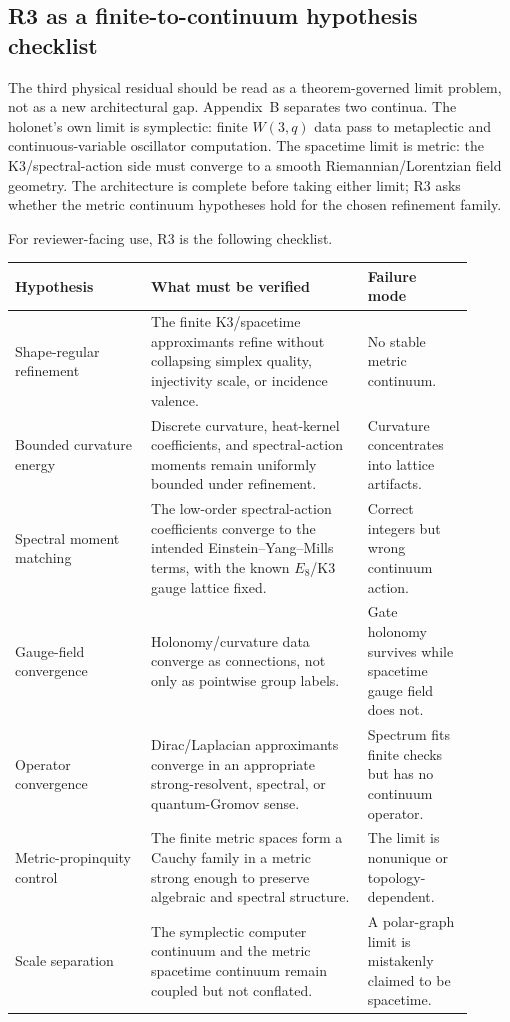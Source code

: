 
\subsection{R3 as a finite-to-continuum hypothesis checklist}
\label{sec:bt1202-r3-checklist}

The third physical residual should be read as a theorem-governed limit problem,
not as a new architectural gap.  Appendix~B separates two continua.  The
holonet's own limit is symplectic: finite $W(3,q)$ data pass to metaplectic and
continuous-variable oscillator computation.  The spacetime limit is metric: the
K3/spectral-action side must converge to a smooth Riemannian/Lorentzian field
geometry.  The architecture is complete before taking either limit; R3 asks
whether the metric continuum hypotheses hold for the chosen refinement family.

For reviewer-facing use, R3 is the following checklist.

\begin{center}
\small
\begin{tabular}{p{0.27\linewidth}p{0.43\linewidth}p{0.21\linewidth}}
\toprule
Hypothesis & What must be verified & Failure mode \\
\midrule
Shape-regular refinement & The finite K3/spacetime approximants refine without
collapsing simplex quality, injectivity scale, or incidence valence. & No stable
metric continuum. \\
Bounded curvature energy & Discrete curvature, heat-kernel coefficients, and
spectral-action moments remain uniformly bounded under refinement. & Curvature
concentrates into lattice artifacts. \\
Spectral moment matching & The low-order spectral-action coefficients converge
to the intended Einstein--Yang--Mills terms, with the known $E_8$/K3 gauge
lattice fixed. & Correct integers but wrong continuum action. \\
Gauge-field convergence & Holonomy/curvature data converge as connections, not
only as pointwise group labels. & Gate holonomy survives while spacetime gauge
field does not. \\
Operator convergence & Dirac/Laplacian approximants converge in an appropriate
strong-resolvent, spectral, or quantum-Gromov sense. & Spectrum fits finite
checks but has no continuum operator. \\
Metric-propinquity control & The finite metric spaces form a Cauchy family in a
metric strong enough to preserve algebraic and spectral structure. & The limit is
nonunique or topology-dependent. \\
Scale separation & The symplectic computer continuum and the metric spacetime
continuum remain coupled but not conflated. & A polar-graph limit is mistakenly
claimed to be spacetime. \\
\bottomrule
\end{tabular}
\end{center}

